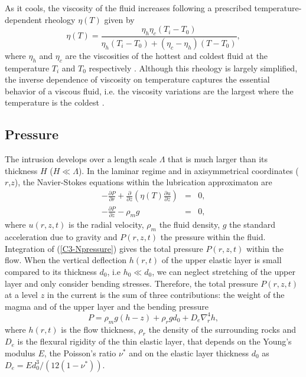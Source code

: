 As  it  cools,  the  viscosity  of the  fluid  increases  following  a
prescribed temperature-dependent rheology $\eta(T)$ given by
\begin{equation}
  \eta(T)=\frac{\eta_h
    \eta_c(T_i-T_0)}{\eta_h(T_i-T_0)+(\eta_c-\eta_h)(T-T_0)},
  \label{C3-rheology}
\end{equation}
where $\eta_h$  and $\eta_c$  are the viscosities  of the  hottest and
coldest  fluid  at  the   temperature  $T_i$  and  $T_0$  respectively
\citep{Bercovici:2007vc}.    Although   this   rheology   is   largely
simplified,  the  inverse  dependence   of  viscosity  on  temperature
captures  the  essential  behavior  of  a  viscous  fluid,  i.e.   the
viscosity  variations are  the largest  where the  temperature is  the
coldest
\citep{Anonymous:CZVBrBvv,Marsh:1981dc,Lejeune:1995fc,Giordano:2008em}.

\subsection{Pressure}
\label{C3-sec:Pressure}

The  intrusion develops  over a  length scale  $\Lambda$ that  is much
larger than its thickness $H$ ($H \ll \Lambda$).  In the laminar regime
and  in   axisymmetrical  coordinates  ($r$,$z$),   the  Navier-Stokes
equations within the lubrication approximaton are
\begin{eqnarray}
  -\frac{\partial P}{\partial r}  +  \frac{\partial}{\partial z}\left(\eta(T) \frac{\partial u}{\partial z}\right) &=&0,\label{C3-V1} \\
  -\frac{\partial P}{\partial z}  - \rho_{m}g&  =&0,\label{C3-Npressure}
\end{eqnarray}
where $u(r,z,t)$ is  the radial velocity, $\rho_m$  the fluid density,
$g$  the  standard acceleration  due  to  gravity and  $P(r,z,t)$  the
pressure within the fluid.   Integration of (\ref{C3-Npressure}) gives
the  total pressure  $P(r,z,t)$ within  the flow.   When the  vertical
deflection $h(r,t)$  of the upper  elastic layer is small  compared to
its thickness  $d_0$, i.e $h_0 \ll d_0$,  we can neglect stretching  of the
upper layer and only consider  bending stresses.  Therefore, the total
pressure $P(r,z,t)$ at a level $z$ in  the current is the sum of three
contributions: the weight of the magma  and of the upper layer and the
bending pressure
\begin{equation}
  P = \rho_m g (h-z)+\rho_rgd_0+D_e\nabla_r^4h,
\end{equation}
where  $h(r,t)$ is  the flow  thickness, $\rho_r$  the density  of the
surrounding  rocks and  $D_e$ is  the  flexural rigidity  of the  thin
elastic layer, that depends on  the Young's modulus $E$, the Poisson's
ratio  $\nu^*$   and  on   the  elastic   layer  thickness   $d_0$  as
$D_e = Ed_0^3/\left(12(1-\nu^*)\right)$.

